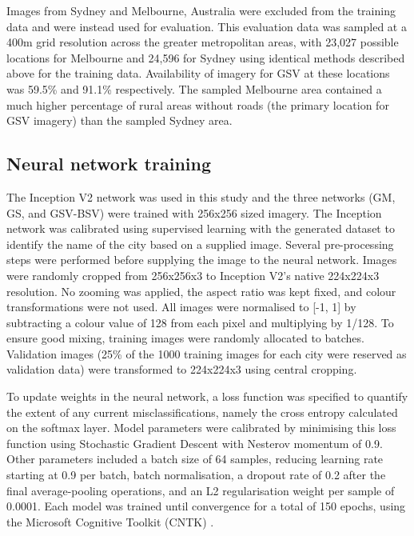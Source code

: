 \documentclass[Crown,sageh,times]{sagej}
\begin{document}
Images from Sydney and Melbourne, Australia were excluded from the training data and were instead used for evaluation. This evaluation data was sampled at a 400m grid resolution across the greater metropolitan areas, with 23,027 possible locations for Melbourne and 24,596 for Sydney using identical methods described above for the training data. Availability of imagery for GSV at these locations was 59.5\% and 91.1\% respectively. The sampled Melbourne area contained a much higher percentage of rural areas without roads (the primary location for GSV imagery) than the sampled Sydney area.


\subsection{Neural network training}\label{sec:methods4}    

The Inception V2 network was used in this study and the three networks (GM, GS, and GSV-BSV) were trained with 256x256 sized imagery. The Inception network was calibrated using supervised learning with the generated dataset to identify the name of the city based on a supplied image. Several pre-processing steps were performed before supplying the image to the neural network. Images were randomly cropped from 256x256x3 to Inception V2's native 224x224x3 resolution. No zooming was applied, the aspect ratio was kept fixed, and colour transformations were not used. All images were normalised to [-1, 1] by subtracting a colour value of 128 from each pixel and multiplying by 1/128. To ensure good mixing, training images were randomly allocated to batches. Validation images (25\% of the 1000 training images for each city were reserved as validation data) were transformed to 224x224x3 using central cropping.


To update weights in the neural network, a loss function was specified to quantify the extent of any current misclassifications, namely the cross entropy calculated on the softmax layer. Model parameters were calibrated by minimising this loss function using Stochastic Gradient Descent with Nesterov momentum of 0.9. Other parameters included a batch size of 64 samples, reducing learning rate starting at 0.9 per batch, batch normalisation, a dropout rate of 0.2 after the final average-pooling operations, and an L2 regularisation weight per sample of 0.0001. Each model was trained until convergence for a total of 150 epochs, using the Microsoft Cognitive Toolkit (CNTK) \cite{Yu2015}. 
\end{document}
